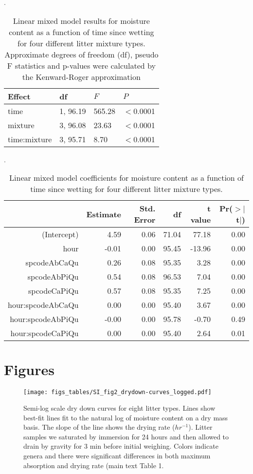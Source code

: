 \documentclass[letterpaper]{article}
\begin{document}
\begin{table}[H]
  \caption{Linear mixed model results for moisture content as a function of
    time since wetting for four different litter mixture types. Approximate
    degrees of freedom (df), pseudo F statistics and p-values were calculated
    by the Kenward-Roger approximation}.
  \label{tab:mixtures_drydown}
\centering

\begin{tabular}{llll}
  \toprule
Effect & df & $F$ & $P$ \\ 
  \midrule
time & 1, 96.19 & 565.28 & $<$0.0001 \\ 
  mixture & 3, 96.08 & 23.63 & $<$0.0001 \\ 
  time:mixture & 3, 95.71 & 8.70 & $<$0.0001 \\ 
   \bottomrule
\end{tabular}
\end{table}

\begin{table}[H]
  \caption{Linear mixed model coefficients for moisture content as a function of
    time since wetting for four different litter mixture types.}.
  \label{tab:mixtures_drydown}
\centering
\begin{tabular}{rrrrrr}
  \toprule
 & Estimate & Std. Error & df & t value & Pr($>$$|$t$|$) \\ 
  \midrule
(Intercept) & 4.59 & 0.06 & 71.04 & 77.18 & 0.00 \\ 
  hour & -0.01 & 0.00 & 95.45 & -13.96 & 0.00 \\ 
  spcodeAbCaQu & 0.26 & 0.08 & 95.35 & 3.28 & 0.00 \\ 
  spcodeAbPiQu & 0.54 & 0.08 & 96.53 & 7.04 & 0.00 \\ 
  spcodeCaPiQu & 0.57 & 0.08 & 95.35 & 7.25 & 0.00 \\ 
  hour:spcodeAbCaQu & 0.00 & 0.00 & 95.40 & 3.67 & 0.00 \\ 
  hour:spcodeAbPiQu & -0.00 & 0.00 & 95.78 & -0.70 & 0.49 \\ 
  hour:spcodeCaPiQu & 0.00 & 0.00 & 95.40 & 2.64 & 0.01 \\ 
   \bottomrule
\end{tabular}
\end{table}

\section*{Figures}


\begin{figure}[H]
  \centering
  \texttt{[image: figs\_tables/SI\_fig2\_drydown-curves\_logged.pdf]}
   \label{SI_fig1}
\caption{Semi-log scale dry down curves for eight litter types. Lines show best-fit lines fit to the natural log of moisture content on a dry mass basis.  The slope of the line shows the drying rate ($hr^{-1}$). Litter samples we saturated by immersion for 24 hours and then allowed to drain by gravity for 3 min before initial weighing. Colors indicate genera and there were significant differences in both maximum absorption and drying rate (main text Table 1.}

\end{figure}
\end{document}
